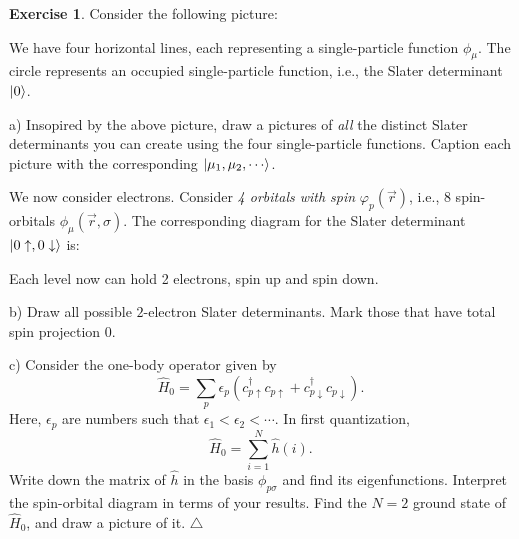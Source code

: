 \documentclass{report}
\theoremstyle{plain}
\theoremstyle{definition}
\newtheorem{exerc}{Exercise}[chapter]
\newcommand\xqed[1]{%
  \leavevmode\unskip\penalty9999 \hbox{}\nobreak\hfill
  \quad\hbox{#1}}
\newcommand\demo{\xqed{$\triangle$}}
\newenvironment{exercise}{\bigskip\begin{exerc}}{\demo\end{exerc}\bigskip}
\begin{document}
\begin{exercise}
  Consider the following picture:
  \begin{center}
  \end{center}
  We have four horizontal lines, each representing a single-particle
  function $\phi_\mu$. The circle represents an occupied
  single-particle function, i.e., the Slater determinant $\ket{0}$.

  a) Insopired by the above picture, draw a pictures of \emph{all} the distinct
  Slater determinants you can create using the four single-particle
  functions. Caption each picture with the corresponding
  $\ket{\mu_1,\mu_2,\cdots}$.

   We now consider electrons. Consider \emph{4 orbitals with spin}
  $\varphi_p(\vec{r})$, i.e., $8$ spin-orbitals
  $\phi_\mu(\vec{r},\sigma)$. The corresponding diagram for the Slater
  determinant $\ket{0\uparrow,0\downarrow}$ is:
  \begin{center}
  \end{center}
  Each level now can hold 2 electrons, spin up and spin down. 

  b) Draw all possible $2$-electron Slater determinants. Mark those
  that have total spin projection 0.

  c) Consider the one-body operator given by
  \[ \hat{H}_0 = \sum_{p} \epsilon_p (c^\dag_{p\uparrow} c_{p\uparrow}
  + c^\dag_{p\downarrow} c_{p\downarrow}). \]  
  Here, $\epsilon_p$ are numbers such that $\epsilon_1 < \epsilon_2 < \cdots$.
  In first quantization,
  \[ \hat{H}_0 = \sum_{i=1}^N \hat{h}(i). \]
  Write down the matrix of $\hat{h}$ in the basis $\phi_{p\sigma}$ and
  find its eigenfunctions. Interpret the spin-orbital diagram in terms
  of your results. Find the $N=2$ ground state of $\hat{H}_0$, and
  draw a picture of it.
\end{exercise}
\end{document}
